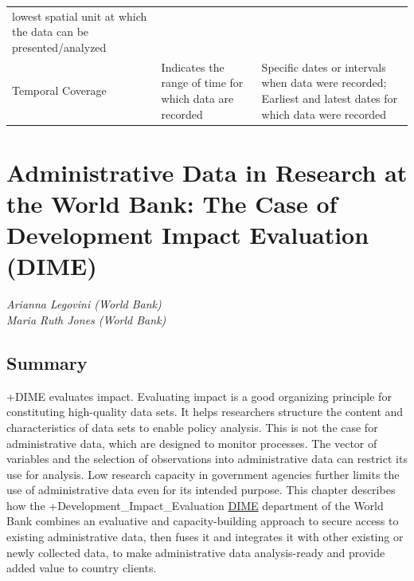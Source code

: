 \documentclass[
]{WileySix}
\begin{document}
\begin{longtable}[]{@{}lll@{}}
\begin{minipage}[t]{0.35\columnwidth}
lowest spatial unit at
which the data can be
presented/analyzed\strut
\end{minipage}\tabularnewline
\begin{minipage}[t]{0.22\columnwidth}\raggedright
Temporal
Coverage\strut
\end{minipage} & \begin{minipage}[t]{0.35\columnwidth}\raggedright
Indicates the range of
time for which data are
recorded\strut
\end{minipage} & \begin{minipage}[t]{0.35\columnwidth}\raggedright
Specific dates or
intervals when data were
recorded; Earliest and
latest dates for which
data were recorded\strut
\end{minipage}\tabularnewline
\bottomrule
\end{longtable}

\hypertarget{dime}{%
\section{Administrative Data in Research at the World Bank: The Case of Development Impact Evaluation (DIME)}\label{dime}}

\emph{Arianna Legovini (World Bank)}\\
\emph{Maria Ruth Jones (World Bank)}

\hypertarget{summary-8}{%
\subsection{Summary}\label{summary-8}}

+DIME\textbar{} evaluates impact. Evaluating impact is a good organizing principle for constituting high-quality data sets. It helps researchers structure the content and characteristics of data sets to enable policy analysis. This is not the case for administrative data, which are designed to monitor processes. The vector of variables and the selection of observations into administrative data can restrict its use for analysis. Low research capacity in government agencies further limits the use of administrative data even for its intended purpose. This chapter describes how the +Development\_Impact\_Evaluation\textbar{} \href{https://www.worldbank.org/en/research/dime}{DIME} department of the World Bank combines an evaluative and capacity-building approach to secure access to existing administrative data, then fuses it and integrates it with other existing or newly collected data, to make administrative data analysis-ready and provide added value to country clients.
\end{document}

